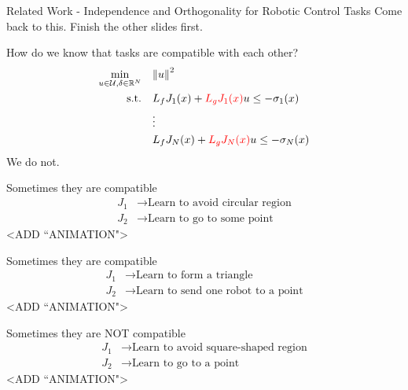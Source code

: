 \begin{frame}{Related Work - Independence and Orthogonality for Robotic Control Tasks}
	Come back to this. Finish the other slides first.
\end{frame}

\begin{frame}{How do we know that tasks are compatible with each other?}
	\begin{align*}
		\min_{u \in \mathcal{U}, \delta \in \mathbb{R}^N} \quad & { \lVert u \rVert }^2 \\
		\textrm{s.t.} \quad & L_f {J}_1 (x) + { \color{red} L_g {J}_1 (x) } u \le - \sigma_1(x) \\
                \quad & \vdots \\
		\quad & L_f {J}_N (x) + { \color{red} L_g {J}_N (x) } u \le - \sigma_N(x) \\
	\end{align*}
	\centering
	We do not.
\end{frame}

\begin{frame}{Sometimes they are compatible}
	\begin{align*}
		{J}_1 &\rightarrow \textrm{Learn to avoid circular region} \\
		{J}_2 &\rightarrow \textrm{Learn to go to some point}
	\end{align*}
	<ADD ``ANIMATION">
\end{frame}

\begin{frame}{Sometimes they are compatible}
	\begin{align*}
		{J}_1 &\rightarrow \textrm{Learn to form a triangle} \\
		{J}_2 &\rightarrow \textrm{Learn to send one robot to a point}
	\end{align*}
	<ADD ``ANIMATION">
\end{frame}

\begin{frame}{Sometimes they are NOT compatible}
	\begin{align*}
		{J}_1 &\rightarrow \textrm{Learn to avoid square-shaped region} \\
		{J}_2 &\rightarrow \textrm{Learn to go to a point}
	\end{align*}
	<ADD ``ANIMATION">
\end{frame}

